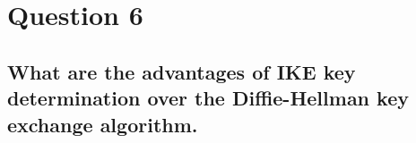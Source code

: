 \documentclass{report}
\begin{document}
	\section{Question 6}
	\startsection
		\renewcommand{\thesubsection}{\thesection.\Alph{subsection}}
		\subsection{What are the advantages of IKE key determination over the Diffie-Hellman key exchange algorithm.}
		\startsubsection
		\closesection
	\closesection
\end{document}
